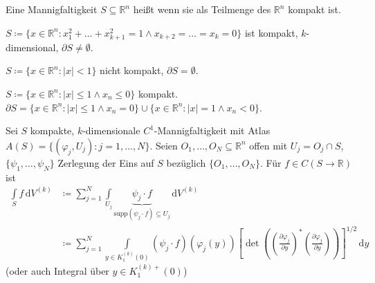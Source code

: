 \documentclass[a4paper,10pt]{scrbook}
\begin{document}
\begin{theorem}[Definition] \label{thm:11.3}
  Eine Mannigfaltigkeit $S \subseteq \mathbb{R}^n$ heißt  wenn sie als Teilmenge des $\mathbb{R}^n$ kompakt ist.
\end{theorem}

\begin{example} \label{thm:11.4}
  \begin{enum-arab}
    \item $S \coloneq \{ x \in \mathbb{R}^n : x_1^2 + \ldots + x_{k+1}^2 = 1 \land x_{k+2} = \ldots = x_k = 0 \}$ ist kompakt, $k$-dimensional, $\partial S \neq \emptyset$.

    \item $S \coloneq \{ x \in \mathbb{R}^n : |x| < 1 \}$ nicht kompakt, $\partial S = \emptyset$.

    \item $S \coloneq \{ x \in \mathbb{R}^n : |x| \leq 1 \land x_n \leq 0 \}$ kompakt. $\partial S = \{ x \in \mathbb{R}^n : |x| \leq 1 \land x_n = 0 \} \cup \{ x \in \mathbb{R}^n : |x| = 1 \land x_n < 0 \}$.
  \end{enum-arab}
\end{example}

\begin{theorem}[Definition] \label{thm:11.5}
  Sei $S$ kompakte, $k$-dimensionale $C^1$-Mannigfaltigkeit mit Atlas $A(S) = \{ (\varphi_j,U_j) : j = 1,\ldots,N \}$. Seien $O_1,\ldots,O_N \subseteq \mathbb{R}^n$ offen mit $U_j = O_j \cap S$, $\{ \psi_1,\ldots,\psi_N \}$ Zerlegung der Eins auf $S$ bezüglich $\{ O_1,\ldots,O_N \}$. Für $f \in C(S \to \mathbb{R})$ ist
  \begin{align*}
    \int\limits_{S} f \, \mathrm{d}V^{(k)}
    &\coloneq \sum\limits_{j=1}^{N} \int\limits_{U_j} \underbrace{\psi_j \cdot f}_{\mathrm{supp}(\psi_j \cdot f) \subseteq U_j} \, \mathrm{d}V^{(k)} \\
    &\coloneq \sum\limits_{j=1}^{N} \int\limits_{y \in K_1^{(k)}(0)} (\psi_j \cdot f) (\varphi_j(y)) \left[ \det \left( \left( \frac{\partial \varphi_j}{\partial y} \right)^* \left( \frac{\partial \varphi_j}{\partial y} \right) \right) \right]^{1/2} \, \mathrm{d}y
  \end{align*}
  (oder auch Integral über $y \in K_1^{(k)+}(0)$)
\end{theorem}
\end{document}
